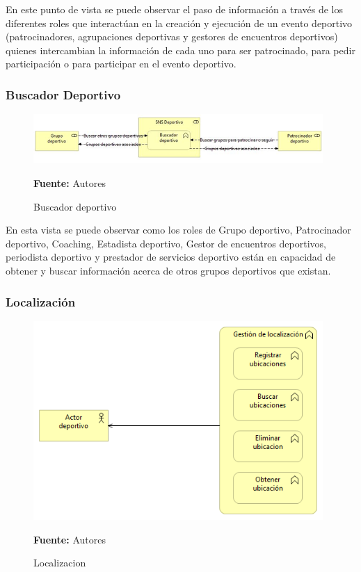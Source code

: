 En este punto de vista se puede observar el paso de información a través de los diferentes roles que interactúan en la creación y ejecución de un evento deportivo (patrocinadores, agrupaciones deportivas y gestores de encuentros deportivos) quienes intercambian la información de cada uno para ser patrocinado, para pedir participación o para participar en el evento deportivo.

\subsubsection{Buscador Deportivo}

\begin{figure}[!htb]
  \begin{center}
    \includegraphics[width=11cm]{./imagenes/Archimate/vistas/business_functions/buscadordeportivo.png}
    \caption{Buscador deportivo}
    \label{fig:BF_BuscadorDeportivo}
    \textbf{Fuente:}  Autores
  \end{center}
\end{figure}

En esta vista se puede observar como los roles de Grupo deportivo, Patrocinador deportivo, Coaching, Estadista deportivo, Gestor de encuentros deportivos, periodista deportivo y prestador de servicios deportivo están en capacidad de obtener y buscar información acerca de otros grupos deportivos que existan.

\subsubsection{Localización}

\begin{figure}[!htb]
  \begin{center}
    \includegraphics[width=11cm]{./imagenes/Archimate/vistas/business_functions/localizacion.png}
    \caption{Localizacion}
    \label{fig:BF_localizacion}
    \textbf{Fuente:}  Autores
  \end{center}
\end{figure}

